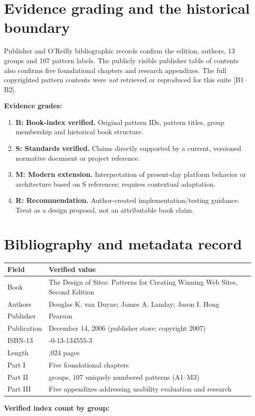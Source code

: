 \documentclass[11pt]{article}
\begin{document}
\MakeFront
\section{Evidence grading and the historical boundary}

\Provenance
\begin{groundedbox}Publisher and O'Reilly bibliographic records confirm the edition, authors, 13 groups and 107 pattern labels. The publicly visible publisher table of contents also confirms five foundational chapters and research appendixes. The full copyrighted pattern contents were \emph{not} retrieved or reproduced for this suite [B1--B2].\end{groundedbox}
\textbf{Evidence grades:}
\begin{enumerate}
\item \textbf{B: Book-index verified.} Original pattern IDs, pattern titles, group membership and historical book structure.
\item \textbf{S: Standards verified.} Claims directly supported by a current, versioned normative document or project reference.
\item \textbf{M: Modern extension.} Interpretation of present-day platform behavior or architecture based on S references; requires contextual adaptation.
\item \textbf{R: Recommendation.} Author-created implementation/testing guidance. Treat as a design proposal, not an attributable book claim.
\end{enumerate}

\section{Bibliography and metadata record}

\begin{tabularx}{\linewidth}{@{}>{\raggedright\arraybackslash}p{32mm}>{\raggedright\arraybackslash}X@{}}\toprule
Field & Verified value\\\midrule
Book & The Design of Sites: Patterns for Creating Winning Web Sites, Second Edition\\
Authors & Douglas K. van Duyne; James A. Landay; Jason I. Hong\\
Publisher & Pearson\\
Publication & December 14, 2006 (publisher store; copyright 2007)\\
ISBN-13 & 978-0-13-134555-3\\
Length & 1,024 pages\\
Part I & Five foundational chapters\\
Part II & 13 groups, 107 uniquely numbered patterns (A1--M3)\\
Part III & Five appendixes addressing usability evaluation and research\\
\bottomrule\end{tabularx}
\textbf{Verified index count by group:}
\end{document}
